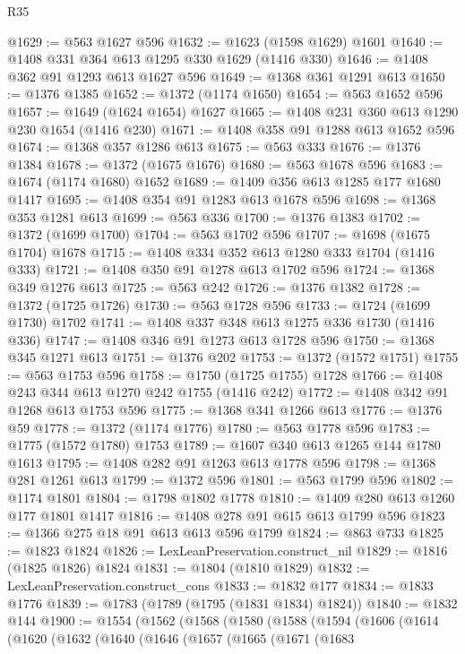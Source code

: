 \begin{lexlean}{R35}
\begin{coremodule}
@1629 := @563 @1627 @596
@1632 := @1623 (@1598 @1629) @1601
@1640 := @1408 @331 @364 @613 @1295 @330 @1629 (@1416 @330)
@1646 := @1408 @362 @91 @1293 @613 @1627 @596
@1649 := @1368 @361 @1291 @613
@1650 := @1376 @1385
@1652 := @1372 (@1174 @1650)
@1654 := @563 @1652 @596
@1657 := @1649 (@1624 @1654) @1627
@1665 := @1408 @231 @360 @613 @1290 @230 @1654 (@1416 @230)
@1671 := @1408 @358 @91 @1288 @613 @1652 @596
@1674 := @1368 @357 @1286 @613
@1675 := @563 @333
@1676 := @1376 @1384
@1678 := @1372 (@1675 @1676)
@1680 := @563 @1678 @596
@1683 := @1674 (@1174 @1680) @1652
@1689 := @1409 @356 @613 @1285 @177 @1680 @1417
@1695 := @1408 @354 @91 @1283 @613 @1678 @596
@1698 := @1368 @353 @1281 @613
@1699 := @563 @336
@1700 := @1376 @1383
@1702 := @1372 (@1699 @1700)
@1704 := @563 @1702 @596
@1707 := @1698 (@1675 @1704) @1678
@1715 := @1408 @334 @352 @613 @1280 @333 @1704 (@1416 @333)
@1721 := @1408 @350 @91 @1278 @613 @1702 @596
@1724 := @1368 @349 @1276 @613
@1725 := @563 @242
@1726 := @1376 @1382
@1728 := @1372 (@1725 @1726)
@1730 := @563 @1728 @596
@1733 := @1724 (@1699 @1730) @1702
@1741 := @1408 @337 @348 @613 @1275 @336 @1730 (@1416 @336)
@1747 := @1408 @346 @91 @1273 @613 @1728 @596
@1750 := @1368 @345 @1271 @613
@1751 := @1376 @202
@1753 := @1372 (@1572 @1751)
@1755 := @563 @1753 @596
@1758 := @1750 (@1725 @1755) @1728
@1766 := @1408 @243 @344 @613 @1270 @242 @1755 (@1416 @242)
@1772 := @1408 @342 @91 @1268 @613 @1753 @596
@1775 := @1368 @341 @1266 @613
@1776 := @1376 @59
@1778 := @1372 (@1174 @1776)
@1780 := @563 @1778 @596
@1783 := @1775 (@1572 @1780) @1753
@1789 := @1607 @340 @613 @1265 @144 @1780 @1613
@1795 := @1408 @282 @91 @1263 @613 @1778 @596
@1798 := @1368 @281 @1261 @613
@1799 := @1372 @596
@1801 := @563 @1799 @596
@1802 := @1174 @1801
@1804 := @1798 @1802 @1778
@1810 := @1409 @280 @613 @1260 @177 @1801 @1417
@1816 := @1408 @278 @91 @615 @613 @1799 @596
@1823 := @1366 @275 @18 @91 @613 @613 @596 @1799
@1824 := @863 @733
@1825 := @1823 @1824
@1826 := LexLeanPreservation.construct_nil
@1829 := @1816 (@1825 @1826) @1824
@1831 := @1804 (@1810 @1829)
@1832 := LexLeanPreservation.construct_cons
@1833 := @1832 @177
@1834 := @1833 @1776
@1839 := @1783 (@1789 (@1795 (@1831 @1834) @1824))
@1840 := @1832 @144
@1900 := @1554
    (@1562
      (@1568
        (@1580
          (@1588
            (@1594
              (@1606
                (@1614
                  (@1620
                    (@1632
                      (@1640
                        (@1646
                          (@1657
                            (@1665
                              (@1671
                                (@1683

\end{coremodule}
\end{lexlean}
